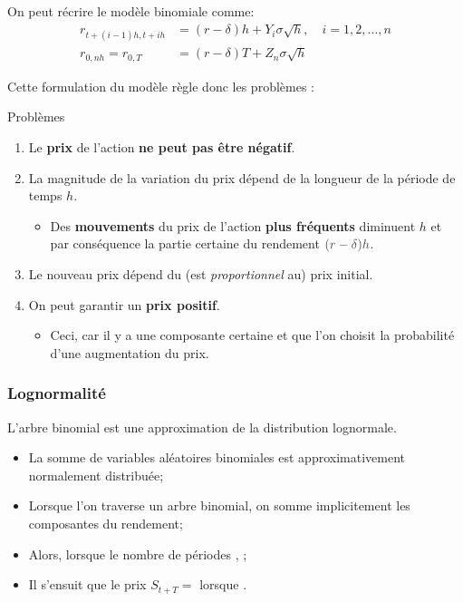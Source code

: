\documentclass[10pt, french]{article}
\begin{document}
\begin{multicols*}{2}
On peut récrire le modèle binomiale comme:
\begin{align*}
	r_{t + (i - 1)h, t + ih}	
	&=	(r	-	\delta)h	+ Y_{i}\sigma	\sqrt{h}, \quad	i	=	1, 2, \dots, n	\\
	r_{0, nh}
	=	r_{0, T}
	&=	(r	-	\delta)T 	+ Z_{n}\sigma	\sqrt{h}
\end{align*}

Cette formulation du modèle règle donc les problèmes :
\begin{conceptgen}{Problèmes}
\begin{enumerate}[leftmargin = *]
	\item	Le \textbf{prix} de l'action \textbf{ne peut pas être négatif}.
	\item	La magnitude de la variation du prix dépend de la longueur de la période de temps $h$.
		\begin{itemize}
		\item	Des \textbf{mouvements} du prix de l'action \textbf{plus fréquents} diminuent $h$ et par conséquence la partie certaine du rendement ${\color{arsenic}(r	-	\delta)h}$.
		\end{itemize}
	\item	Le nouveau prix dépend du (est \textit{proportionnel} au) prix initial.
	\item	On peut garantir un \textbf{prix positif}. 
		\begin{itemize}[leftmargin = *]
		\item	Ceci, car il y a une composante certaine et que l'on choisit la probabilité d'une augmentation du prix.
		\end{itemize}
\end{enumerate}
\end{conceptgen}

\subsubsection{Lognormalité}

L'arbre binomial est une approximation de la distribution lognormale.
\begin{itemize}
	\item	La somme de variables aléatoires binomiales est approximativement normalement distribuée;
	\item	Lorsque l'on traverse un arbre binomial, on somme implicitement les composantes du rendement;
	\item	Alors, lorsque le nombre de périodes , ;
	\item	Il s'ensuit que le prix $S_{t + T}	=$	 lorsque .
\end{itemize}


\end{multicols*}
\end{document}

